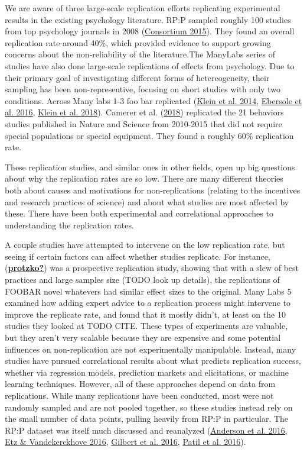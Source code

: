\documentclass[
  english,
  a4paper,
]{article}
\begin{document}
We are aware of three large-scale replication efforts replicating experimental results in the existing psychology literature. RP:P sampled roughly 100 studies from top psychology journals in 2008 (\protect\hyperlink{ref-openscienceconsortium2015}{Consortium 2015}). They found an overall replication rate around 40\%, which provided evidence to support growing concerns about the non-reliability of the literature.The ManyLabs series of studies have also done large-scale replications of effects from psychology. Due to their primary goal of investigating different forms of hetereogeneity, their sampling has been non-representive, focusing on short studies with only two conditions. Across Many labs 1-3 foo bar replicated (\protect\hyperlink{ref-klein2014}{Klein et al. 2014}, \protect\hyperlink{ref-ebersole2016}{Ebersole et al. 2016}, \protect\hyperlink{ref-klein2018}{Klein et al. 2018}). Camerer et al. (\protect\hyperlink{ref-camerer2018}{2018}) replicated the 21 behaviors studies published in Nature and Science from 2010-2015 that did not require special populations or special equipment. They found a roughly 60\% replication rate.

These replication studies, and similar ones in other fields, open up big questions about why the replication rates are so low. There are many different theories both about causes and motivations for non-replications (relating to the incentives and research practices of science) and about what studies are most affected by these. There have been both experimental and correlational approaches to understanding the replication rates.

A couple studies have attempted to intervene on the low replication rate, but seeing if certain factors can affect whether studies replicate. For instance, (\protect\hyperlink{ref-protzko}{\textbf{protzko?}}) was a prospective replication study, showing that with a slew of best practices and large samples size (TODO look up details), the replications of FOOBAR novel whatevers had similar effect sizes to the original. Many Labs 5 examined how adding expert advice to a replication process might intervene to improve the replicate rate, and found that it mostly didn't, at least on the 10 studies they looked at TODO CITE. These types of experiments are valuable, but they aren't very scalable because they are expensive and some potential influences on non-replication are not experimentally manipulable.
Instead, many studies have pursued correlational results about what predicts replication success, whether via regression models, prediction markets and elicitations, or machine learning techniques. However, all of these approaches depend on data from replications. While many replications have been conducted, most were not randomly sampled and are not pooled together, so these studies instead rely on the small number of data points, pulling heavily from RP:P in particular. The RP:P dataset was itself much discussed and reanalyzed (\protect\hyperlink{ref-anderson2016}{Anderson et al. 2016}, \protect\hyperlink{ref-etz2016}{Etz \& Vandekerckhove 2016}, \protect\hyperlink{ref-gilbert2016}{Gilbert et al. 2016}, \protect\hyperlink{ref-patil2016}{Patil et al. 2016}).
\end{document}
